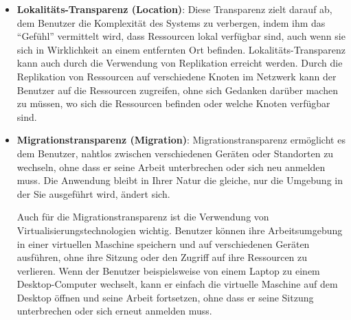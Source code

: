 \documentclass[../vs-script-first-v01.tex]{subfiles}
\begin{document}
\begin{itemize}
  \item \textbf{Lokalitäts-Transparenz (Location)}: Diese Transparenz zielt darauf ab, dem Benutzer die Komplexität des Systems zu verbergen, indem ihm das \enquote{Gefühl} vermittelt wird, dass Ressourcen lokal verfügbar sind, auch wenn sie sich in Wirklichkeit an einem entfernten Ort befinden.
        Lokalitäts-Transparenz kann auch durch die Verwendung von Replikation erreicht werden. Durch die Replikation von Ressourcen auf verschiedene Knoten im Netzwerk kann der Benutzer auf die Ressourcen zugreifen, ohne sich Gedanken darüber machen zu müssen, wo sich die Ressourcen befinden oder welche Knoten verfügbar sind.

  \item \textbf{Migrationstransparenz (Migration)}: %
        Migrationstransparenz ermöglicht es dem Benutzer, nahtlos zwischen verschiedenen Geräten oder Standorten zu wechseln, ohne dass er seine Arbeit unterbrechen oder sich neu anmelden muss. Die Anwendung bleibt in Ihrer Natur die gleiche, nur die Umgebung in der Sie ausgeführt wird, ändert sich.

        Auch für die Migrationstransparenz ist die Verwendung von Virtualisierungstechnologien wichtig. Benutzer können ihre Arbeitsumgebung in einer virtuellen Maschine speichern und auf verschiedenen Geräten ausführen, ohne ihre Sitzung oder den Zugriff auf ihre Ressourcen zu verlieren. Wenn der Benutzer beispielsweise von einem Laptop zu einem Desktop-Computer wechselt, kann er einfach die virtuelle Maschine auf dem Desktop öffnen und seine Arbeit fortsetzen, ohne dass er seine Sitzung unterbrechen oder sich erneut anmelden muss.


\end{itemize}
\end{document}
